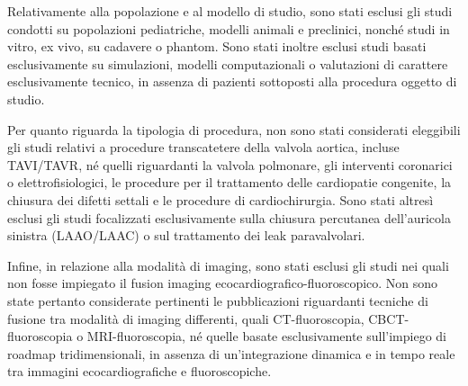 \documentclass[12pt,a4paper,twoside]{article}
\begin{document}
Relativamente alla popolazione e al modello di studio, sono stati esclusi gli studi condotti su popolazioni pediatriche, modelli animali e preclinici, nonché studi in vitro, ex vivo, su cadavere o phantom. Sono stati inoltre esclusi studi basati esclusivamente su simulazioni, modelli computazionali o valutazioni di carattere esclusivamente tecnico, in assenza di pazienti sottoposti alla procedura oggetto di studio.

Per quanto riguarda la tipologia di procedura, non sono stati considerati eleggibili gli studi relativi a procedure transcatetere della valvola aortica, incluse TAVI/TAVR, né quelli riguardanti la valvola polmonare, gli interventi coronarici o elettrofisiologici, le procedure per il trattamento delle cardiopatie congenite, la chiusura dei difetti settali e le procedure di cardiochirurgia. Sono stati altresì esclusi gli studi focalizzati esclusivamente sulla chiusura percutanea dell'auricola sinistra (LAAO/LAAC) o sul trattamento dei leak paravalvolari.

Infine, in relazione alla modalità di imaging, sono stati esclusi gli studi nei quali non fosse impiegato il fusion imaging ecocardiografico-fluoroscopico. Non sono state pertanto considerate pertinenti le pubblicazioni riguardanti tecniche di fusione tra modalità di imaging differenti, quali CT-fluoroscopia, CBCT-fluoroscopia o MRI-fluoroscopia, né quelle basate esclusivamente sull'impiego di roadmap tridimensionali, in assenza di un'integrazione dinamica e in tempo reale tra immagini ecocardiografiche e fluoroscopiche.
\end{document}

